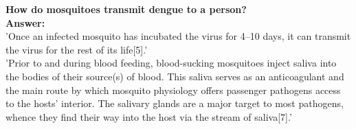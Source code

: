 \documentclass[11pt]{exam}
\begin{document}
\begin{questions}

\newpage
\question
\label{5. Dengue transmission }
\textbf{How do mosquitoes transmit dengue to a person?}\\
\textbf{Answer:}\\
'Once an infected mosquito has incubated the virus for 4–10 days, it can transmit the virus for the rest of its life[5].' \\ 
'Prior to and during blood feeding, blood-sucking mosquitoes inject saliva into the bodies of their source(s) of blood. This saliva serves as an anticoagulant %
and the main route by which mosquito physiology offers passenger pathogens access to the hosts' interior. The salivary glands are a major target to most pathogens, whence they find their way into the host via the stream of saliva[7].' \\ 


\end{questions}
\end{document}
